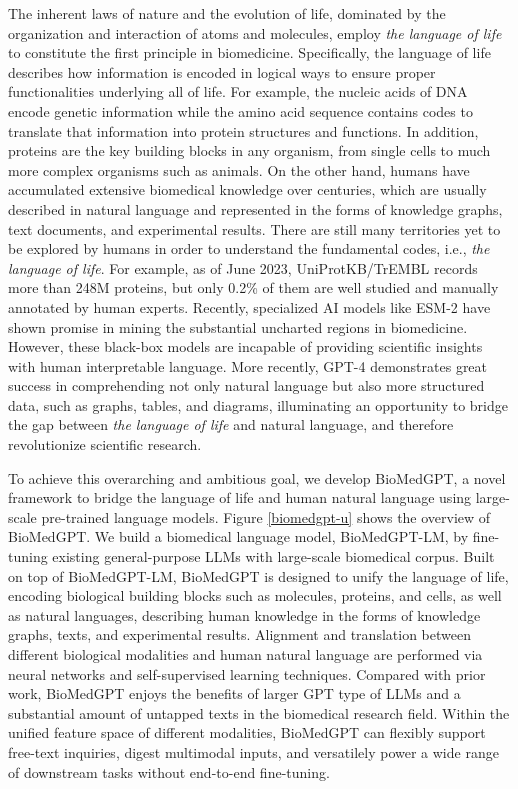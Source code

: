 \documentclass{article}
\begin{document}
The inherent laws of nature and the evolution of life, dominated by the organization and interaction of atoms and molecules, employ \textit{the language of life} to constitute the first principle in biomedicine. Specifically, the language of life describes how information is encoded in logical ways to ensure proper functionalities underlying all of life. For example, the nucleic acids of DNA encode genetic information while the amino acid sequence contains codes to translate that information into protein structures and functions. In addition, proteins are the key building blocks in any organism, from single cells to much more complex organisms such as animals. On the other hand, humans have accumulated extensive biomedical knowledge over centuries, which are usually described in natural language and represented in the forms of knowledge graphs, text documents, and experimental results. There are still many territories yet to be explored by humans in order to understand the fundamental codes, i.e., \textit{the language of life}. For example, as of June 2023, UniProtKB/TrEMBL \citep{UniProt} records more than 248M proteins, but only 0.2\% of them are well studied and manually annotated by human experts. Recently, specialized AI models like ESM-2 \citep{ESM2} have shown promise in mining the substantial uncharted regions in biomedicine. However, these black-box models are incapable of providing scientific insights with human interpretable language. More recently, GPT-4 \citep{openai2023gpt4} demonstrates great success in comprehending not only natural language but also more structured data, such as graphs, tables, and diagrams, illuminating an opportunity to bridge the gap between \textit{the language of life} and natural language, and therefore revolutionize scientific research.

To achieve this overarching and ambitious goal, we develop BioMedGPT, a novel framework to bridge the language of life and human natural language using large-scale pre-trained language models. Figure \ref{biomedgpt-u} shows the overview of BioMedGPT. We build a biomedical language model, BioMedGPT-LM, by fine-tuning existing general-purpose LLMs with large-scale biomedical corpus. Built on top of BioMedGPT-LM, BioMedGPT is designed to unify the language of life, encoding biological building blocks such as molecules, proteins, and cells, as well as natural languages, describing human knowledge in the forms of knowledge graphs, texts, and experimental results. Alignment and translation between different biological modalities and human natural language are performed via neural networks and self-supervised learning techniques. Compared with prior work, BioMedGPT enjoys the benefits of larger GPT type of LLMs and a substantial amount of untapped texts in the biomedical research field. Within the unified feature space of different modalities, BioMedGPT can flexibly support free-text inquiries, digest multimodal inputs, and versatilely power a wide range of downstream tasks without end-to-end fine-tuning.
\end{document}
